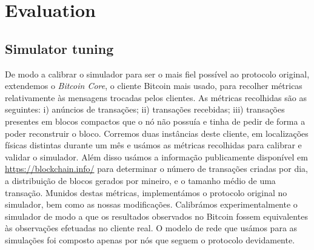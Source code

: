 \chapter{Evaluation}
\label{chap:evaluation}
\section{Simulator tuning}
\label{sec:sim_tuning}

De modo a calibrar o simulador para ser o mais fiel possível ao protocolo original, extendemos o \textit{Bitcoin Core}, o cliente Bitcoin mais usado, para recolher métricas relativamente às mensagens trocadas pelos clientes.
As métricas recolhidas são as seguintes: i) anúncios de transações; ii) transações recebidas; iii) transações presentes em blocos compactos que o nó não possuía e tinha de pedir de forma a poder reconstruir o bloco.
Corremos duas instâncias deste cliente, em localizações físicas distintas durante um mês e usámos as métricas recolhidas para calibrar e validar o simulador.
Além disso usámos a informação publicamente disponível em \url{https://blockchain.info/} para determinar o número de transações criadas por dia, a distribuição de blocos gerados por mineiro, e o tamanho médio de uma transação.
Munidos destas métricas, implementámos o protocolo original no simulador, bem como as nossas modificações. Calibrámos experimentalmente o simulador de modo a que os resultados observados no Bitcoin fossem equivalentes às observações efetuadas no cliente real.
O modelo de rede que usámos para as simulações foi composto apenas por nós que seguem o protocolo devidamente.



